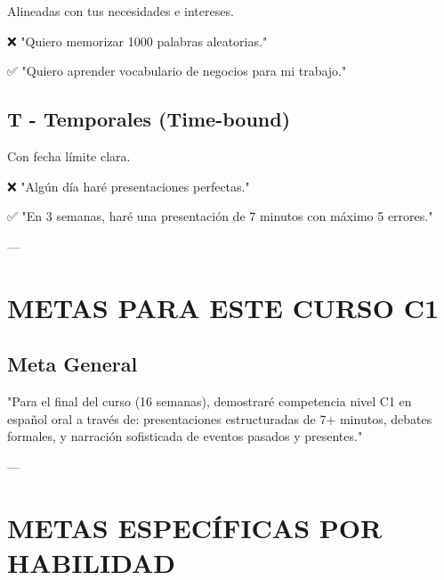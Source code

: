 \documentclass[a4paper,11pt]{article}
\begin{document}
Alineadas con tus necesidades e intereses.

\vspace{0.2cm}

❌ "Quiero memorizar 1000 palabras aleatorias."

✅ "Quiero aprender vocabulario de negocios para mi trabajo."

\vspace{0.2cm}

\subsection{T - Temporales (Time-bound)}

Con fecha límite clara.

\vspace{0.2cm}

❌ "Algún día haré presentaciones perfectas."

✅ "En 3 semanas, haré una presentación de 7 minutos con máximo 5 errores."

\vspace{0.2cm}

---

\vspace{0.2cm}

\section{METAS PARA ESTE CURSO C1}

\vspace{0.2cm}

\subsection{Meta General}

"Para el final del curso (16 semanas), demostraré competencia nivel C1 en español oral a través de: presentaciones estructuradas de 7+ minutos, debates formales, y narración sofisticada de eventos pasados y presentes."

\vspace{0.2cm}

---

\vspace{0.2cm}

\section{METAS ESPECÍFICAS POR HABILIDAD}
\end{document}
